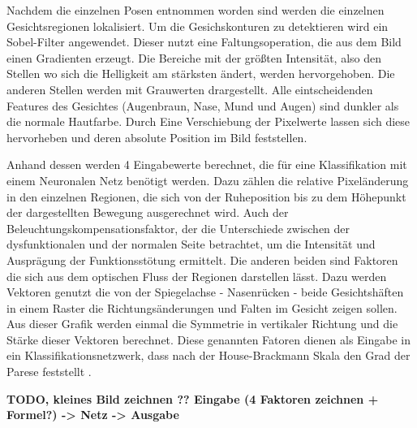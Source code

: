 Nachdem die einzelnen Posen entnommen worden sind werden die einzelnen Gesichtsregionen lokalisiert. Um die Gesichskonturen zu detektieren wird ein Sobel-Filter angewendet. Dieser nutzt eine Faltungsoperation, die aus dem Bild einen Gradienten erzeugt. Die Bereiche mit der größten Intensität, also den Stellen wo sich die Helligkeit am stärksten ändert, werden hervorgehoben. Die anderen Stellen werden mit Grauwerten drargestellt. Alle eintscheidenden Features des Gesichtes (Augenbraun, Nase, Mund und Augen) sind dunkler als die normale Hautfarbe. Durch Eine Verschiebung der Pixelwerte lassen sich diese hervorheben und deren absolute Position im Bild feststellen.

Anhand dessen werden 4 Eingabewerte berechnet, die für eine Klassifikation mit einem Neuronalen Netz benötigt werden. Dazu zählen die relative Pixeländerung in den einzelnen Regionen, die sich von der Ruheposition bis zu dem Höhepunkt der dargestellten Bewegung ausgerechnet wird. Auch der Beleuchtungskompensationsfaktor, der die Unterschiede zwischen der dysfunktionalen und der normalen Seite betrachtet, um die Intensität und Ausprägung der Funktionsstötung ermittelt. Die anderen beiden sind Faktoren die sich aus dem optischen Fluss der Regionen darstellen lässt. Dazu werden Vektoren genutzt die von der Spiegelachse - Nasenrücken - beide Gesichtshäften in einem Raster die Richtungsänderungen und Falten im Gesicht zeigen sollen. Aus dieser Grafik werden einmal die Symmetrie in vertikaler Richtung und die Stärke dieser Vektoren berechnet. Diese genannten Fatoren dienen als Eingabe in ein Klassifikationsnetzwerk, dass nach der House-Brackmann Skala den Grad der Parese feststellt \cite{detection_fp1}.

\textbf{TODO, kleines Bild zeichnen ?? Eingabe (4 Faktoren zeichnen + Formel?) -> Netz -> Ausgabe}
